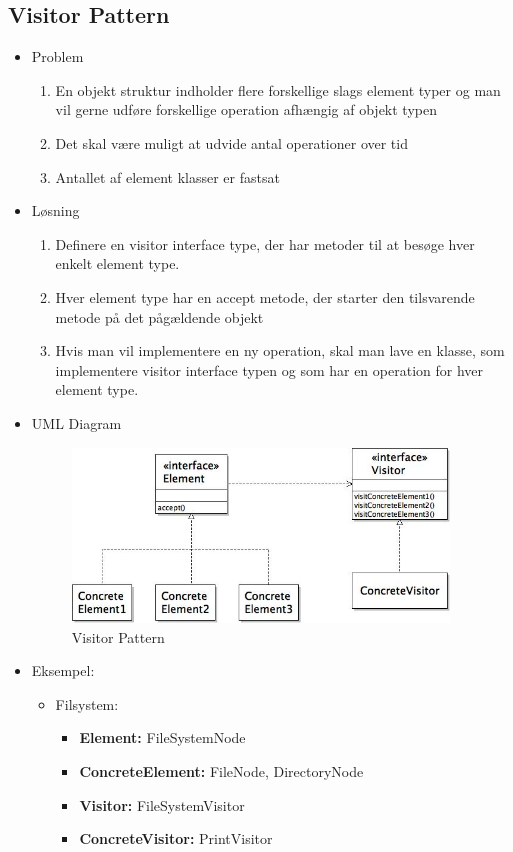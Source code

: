 \documentclass{article}
\begin{document}
\subsection{Visitor Pattern}
\begin{itemize}
	\item Problem
	\begin{enumerate}
		\item En objekt struktur indholder flere forskellige slags element typer og man vil gerne udføre forskellige operation afhængig af objekt typen
		\item Det skal være muligt at udvide antal operationer over tid
		\item Antallet af element klasser er fastsat
	\end{enumerate}
	\item Løsning
	\begin{enumerate}
		\item Definere en visitor interface type, der har metoder til at besøge hver enkelt element type.
		\item Hver element type har en accept metode, der starter den tilsvarende metode på det pågældende objekt
		\item Hvis man vil implementere en ny operation, skal man lave en klasse, som implementere visitor interface typen og som har en operation for hver element type.  
	\end{enumerate}
	\item UML Diagram
	\newpage
	\begin{figure}[ht!]
		\centering
		\includegraphics[width=100mm]{img/visitorUML.jpeg}
		\caption{Visitor Pattern  \label{UMLvisitor}}
	\end{figure}
	
	\item Eksempel:
	\begin{itemize}
		\item Filsystem:
		\begin{itemize}
			\item \textbf{Element:} FileSystemNode
			\item \textbf{ConcreteElement:} FileNode, DirectoryNode
			\item \textbf{Visitor:} FileSystemVisitor
			\item \textbf{ConcreteVisitor:} PrintVisitor
		\end{itemize}
	\end{itemize}
\end{itemize}
\end{document}
